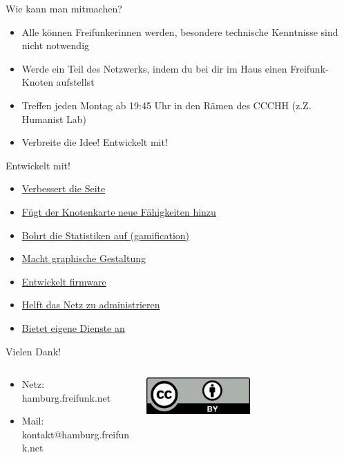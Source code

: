 \documentclass[c]{beamer}
\begin{document}
\begin{frame}{Wie kann man mitmachen?}
	\begin{itemize}
		\item Alle können Freifunker\textunderscore innen werden, besondere technische Kenntnisse sind nicht notwendig
		\item Werde ein Teil des Netzwerks, indem du bei dir im Haus einen Freifunk-Knoten aufstellst
		\item Treffen jeden Montag ab 19:45 Uhr in den Rämen des CCCHH (z.Z. Humanist Lab)
		\item Verbreite die Idee! Entwickelt mit!
	\end{itemize}
\end{frame}


\begin{frame}{Entwickelt mit!}
	\begin{itemize}
		\item \href{http://hamburg.freifunk.net}{Verbessert die Seite}
		\item \href{http://knotenkarte.de}{Fügt der Knotenkarte neue Fähigkeiten hinzu}
		\item \href{http://www.ohrensessel.net/ffhh/total}{Bohrt die Statistiken auf (gamification)}
		\item \href{http://media.hamburg.freifunk.net}{Macht graphische Gestaltung}
		\item \href{https://github.com/freifunkhamburg/}{Entwickelt firmware}
		\item \href{http://wiki.freifunk.net/Freifunk_Hamburg\#Technik}{Helft das Netz zu administrieren}
		\item \href{http://hamburg.freifunk.net/wo-wird-gefunkt\#Dienste}{Bietet eigene Dienste an}
	\end{itemize}
\end{frame}


\begin{frame}{Vielen Dank!}
	\begin{columns}
		\begin{column}{0.6\textwidth}
			\begin{itemize}
				\item Netz: hamburg.freifunk.net
				\item Mail: kontakt@hamburg.freifunk.net
		\end{itemize}
		\end{column}
		\begin{column}{0.5\textwidth}
			\begin{center}
				\includegraphics[width=0.5\textwidth]{Bilder/cc-by}
			\end{center}
		\end{column}
	\end{columns}
\end{frame}
\end{document}
